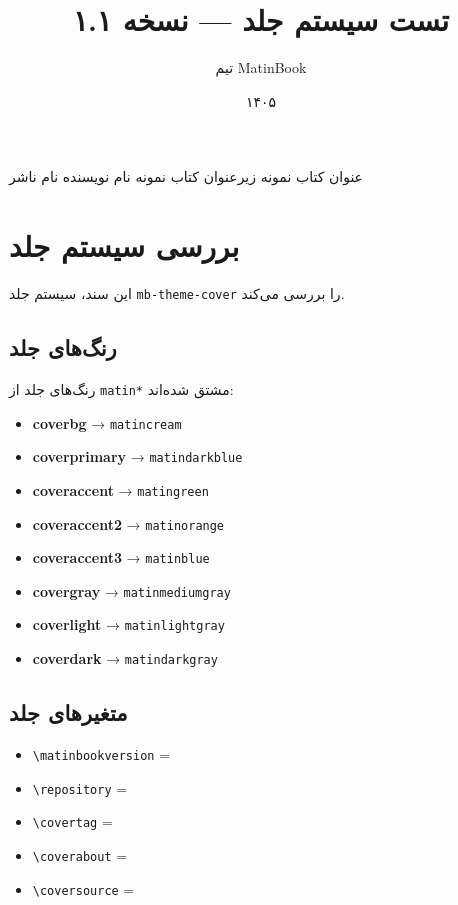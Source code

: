 \documentclass{matinbook}
\title{تست سیستم جلد — نسخه ۱.۱}
\author{تیم MatinBook}
\date{۱۴۰۵}
\begin{document}
\makecover
    {عنوان کتاب نمونه}
    {زیرعنوان کتاب نمونه}
    {نام نویسنده}
    {نام ناشر}

\chapter{بررسی سیستم جلد}
\label{chap:test-cover}

این سند، سیستم جلد \texttt{mb-theme-cover} را بررسی می‌کند.

\section{رنگ‌های جلد}
\label{sec:cover-colors}

رنگ‌های جلد از \texttt{matin*} مشتق شده‌اند:

\begin{itemize}
    \item \textcolor{coverbg}{\textbf{coverbg}} → \texttt{matincream}
    \item \textcolor{coverprimary}{\textbf{coverprimary}} → \texttt{matindarkblue}
    \item \textcolor{coveraccent}{\textbf{coveraccent}} → \texttt{matingreen}
    \item \textcolor{coveraccent2}{\textbf{coveraccent2}} → \texttt{matinorange}
    \item \textcolor{coveraccent3}{\textbf{coveraccent3}} → \texttt{matinblue}
    \item \textcolor{covergray}{\textbf{covergray}} → \texttt{matinmediumgray}
    \item \textcolor{coverlight}{\textbf{coverlight}} → \texttt{matinlightgray}
    \item \textcolor{coverdark}{\textbf{coverdark}} → \texttt{matindarkgray}
\end{itemize}

\section{متغیرهای جلد}
\label{sec:cover-variables}

\begin{itemize}
    \item \texttt{\textbackslash matinbookversion} = \matinbookversion
    \item \texttt{\textbackslash repository} = \repository
    \item \texttt{\textbackslash covertag} = \covertag
    \item \texttt{\textbackslash coverabout} = \coverabout
    \item \texttt{\textbackslash coversource} = \coversource
\end{itemize}
\end{document}
